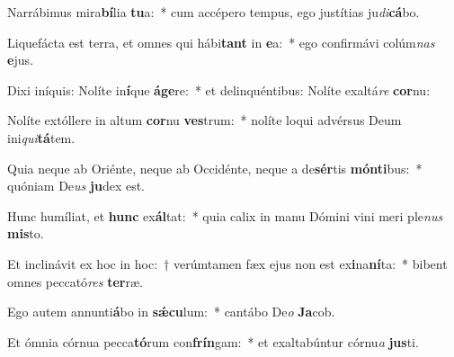 \item Narrábimus mira\textbf{bí}lia \textbf{tu}a:~* cum accépero tempus, ego justítias ju\textit{di}\textbf{cá}bo.
\item Liquefácta est terra, et omnes qui hábi\textbf{tant} in \textbf{e}a:~* ego confirmávi colúm\textit{nas} \textbf{e}jus.
\item Dixi iníquis: Nolíte in\textbf{í}que \textbf{á}\textbf{ge}re:~* et delinquéntibus: Nolíte exaltá\textit{re} \textbf{cor}nu:
\item Nolíte extóllere in altum \textbf{cor}nu \textbf{ves}trum:~* nolíte loqui advérsus Deum ini\textit{qui}\textbf{tá}tem.
\item Quia neque ab Oriénte, neque ab Occidénte, neque a de\textbf{sér}tis \textbf{món}\textbf{ti}bus:~* quóniam De\textit{us} \textbf{ju}dex est.
\item Hunc humíliat, et \textbf{hunc} ex\textbf{ál}tat:~* quia calix in manu Dómini vini meri ple\textit{nus} \textbf{mis}to.
\item Et inclinávit ex hoc in hoc:~† verúmtamen fæx ejus non est ex\textbf{i}na\textbf{ní}ta:~* bibent omnes peccató\textit{res} \textbf{ter}ræ.
\item Ego autem annunti\textbf{á}bo in \textbf{sǽ}\textbf{cu}lum:~* cantábo De\textit{o} \textbf{Ja}cob.
\item Et ómnia córnua pecca\textbf{tó}rum con\textbf{frín}gam:~* et exaltabúntur córnu\textit{a} \textbf{jus}ti.
